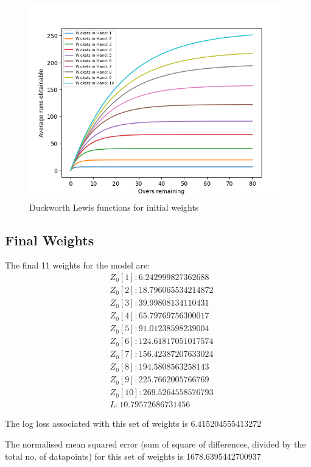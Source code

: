 \documentclass[12pt]{article}
\begin{document}
\begin{figure}[H]
    \centering
    \includegraphics[width=\textwidth]{plots/22205_Plot1.png}
    \caption{Duckworth Lewis functions for initial weights}
\end{figure}

\subsection*{Final Weights}
The final 11 weights for the model are:
\begin{align*}
    &Z_0[1]: 6.242999827362688 \\
    &Z_0[2]: 18.796065534214872 \\
    &Z_0[3]: 39.99808134110431 \\
    &Z_0[4]: 65.79769756300017 \\
    &Z_0[5]: 91.01238598239004 \\ 
    &Z_0[6]: 124.61817051017574 \\
    &Z_0[7]: 156.42387207633024 \\
    &Z_0[8]: 194.5808563258143 \\
    &Z_0[9]: 225.7662005766769 \\
    &Z_0[10]: 269.5264558576793 \\
    &L: 10.79572686731456
\end{align*}

The log loss associated with this set of weights is 6.415204555413272

The normalised mean squared error (sum of square of differences, divided by the total no. of datapoints) for this set of weights is 1678.6395442700937
\end{document}
